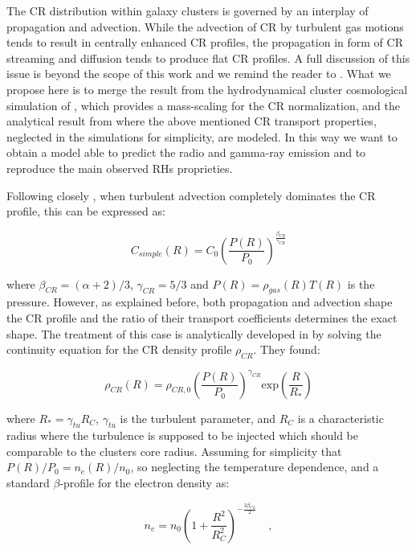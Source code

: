 \documentclass[traditabstract]{aa}
\newcommand{\rmn}{\mathrm}
\begin{document}
The CR distribution within galaxy clusters is governed by an interplay of propagation and advection. While the advection of CR by turbulent gas motions tends to result in centrally enhanced CR profiles, the propagation in form of CR streaming and diffusion tends to produce flat CR profiles. A full discussion of this issue is beyond the scope of this work and we remind the reader to \cite{2011A&A...527A..99E}. What we propose here is to merge the result from the hydrodynamical cluster cosmological simulation of \cite{2010MNRAS.409..449P}, which provides a mass-scaling for the CR normalization, and the analytical result from \cite{2011A&A...527A..99E} where the above mentioned CR transport properties, neglected in the \cite{2010MNRAS.409..449P} simulations for simplicity, are modeled. In this way we want to obtain a model able to predict the radio and gamma-ray emission and to reproduce the main observed RHs proprieties.

Following closely \cite{2011A&A...527A..99E}, when turbulent advection completely dominates the CR profile, this can be expressed as:

\begin{equation}
C_{simple}(R) = C_{0} \left( \frac{P(R)}{P_{0}} \right)^{\frac{\beta_{CR}}{\gamma_{CR}}}
\label{eq:Csimple}
\end{equation} 

where $\beta_{CR}=(\alpha+2)/3$, $\gamma_{CR}=5/3$ and $P(R)=\rho_{gas}(R)T(R)$ is the pressure. However, as explained before, both propagation and advection shape the CR profile and the ratio of their transport coefficients determines the exact shape. The treatment of this case is analytically developed in \cite{2011A&A...527A..99E} by solving the continuity equation for the CR density profile $\rho_{CR}$. They found:

\begin{equation}
\rho_{CR}(R) = \rho_{CR,0} \left( \frac{P(R)}{P_{0}} \right)^{\gamma_{CR}} \rmn{exp} \left( \frac{R}{R_{*}} \right)
\label{eg:rhoCR}
\end{equation} 

where $R_{*}=\gamma_{tu}R_{C}$, $\gamma_{tu}$ is the turbulent parameter, and $R_{C}$ is a characteristic radius where the turbulence is supposed to be injected which should be comparable to the clusters core radius. Assuming for simplicity that $P(R)/P_{0}=n_{e}(R)/n_{0}$, so neglecting the temperature dependence, and a standard $\beta$-profile for the electron density as:

\begin{equation}
n_{e} = n_{0} \left( 1+\frac{R^{2}}{R_{C}^{2}} \right)^{-\frac{3\beta_{CL}}{2}} \quad ,
\label{eq:beta_profile}
\end{equation} 
\end{document}
